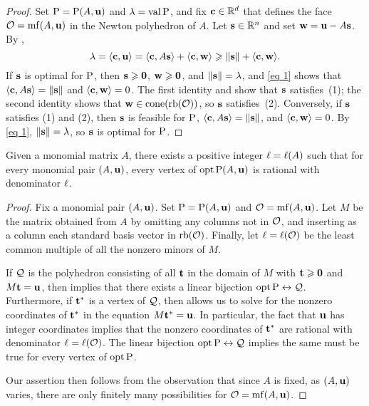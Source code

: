 \documentclass[11pt]{amsart}
\begin{document}
\begin{proof}
   Set $\mathrm{P} = \mathrm{P}(A, \mathbf{u})$ and $\lambda = \operatorname{val} \mathrm{P} $, and fix $\mathbf{c} \in \mathbb{R}^d$ that defines the face $\mathcal{O} = \operatorname{mf}(A, \mathbf{u})$ in the Newton polyhedron of $A$.
   Let $\mathbf{s} \in \mathbb{R}^n$ and set $\mathbf{w} = \mathbf{u} - A\mathbf{s}$.
   By ,
   \begin{equation}\label{eq 1}
      \lambda = \langle \mathbf{c}, \mathbf{u} \rangle = \langle \mathbf{c}, A \mathbf{s} \rangle + \langle \mathbf{c}, \mathbf{w} \rangle \geqslant \| \mathbf{s} \| + \langle \mathbf{c}, \mathbf{w} \rangle.
   \end{equation}
   If $\mathbf{s}$ is optimal for $\mathrm{P}$, then $\mathbf{s} \geqslant \mathbf{0}$, $\mathbf{w} \geqslant \mathbf{0}$, and $\| \mathbf{s} \| = \lambda$, and \eqref{eq 1} shows that $\langle \mathbf{c}, A \mathbf{s} \rangle = \| \mathbf{s} \|$ and $\langle \mathbf{c}, \mathbf{w} \rangle = 0$.
   The first identity and  show that $\mathbf{s}$ satisfies~(1); the second identity shows that $\mathbf{w}\in \operatorname{cone}(\operatorname{rb}(\mathcal{O}))$, so $\mathbf{s}$ satisfies~(2).
   Conversely, if $\mathbf{s}$ satisfies (1) and (2), then $\mathbf{s}$ is feasible for $\mathrm{P}$, $\langle \mathbf{c}, A \mathbf{s} \rangle = \| \mathbf{s} \|$, and $\langle \mathbf{c}, \mathbf{w} \rangle = 0$.
   By \eqref{eq 1}, $\| \mathbf{s} \| = \lambda$, so $\mathbf{s}$ is optimal for $\mathrm{P}$.
\end{proof}

\begin{theorem}  
\label{uniform denominators for vertices:  T}
Given a monomial matrix $A$, there exists a positive integer $\ell = \ell(A)$ such that for every monomial pair $(A, \mathbf{u})$, every vertex of $\operatorname{opt} \mathrm{P}(A, \mathbf{u})$ is rational with denominator $\ell$.
\end{theorem}

\begin{proof}
Fix a monomial pair $(A, \mathbf{u})$. Set $\mathrm{P} = \mathrm{P}(A, \mathbf{u})$ and $\mathcal{O} = \operatorname{mf}(A, \mathbf{u})$.  Let $M$ be the matrix obtained from $A$ by omitting any columns not in $\mathcal{O}$, and inserting as a column each standard basis vector in $\operatorname{rb}(\mathcal{O})$.  Finally, let $\ell = \ell(\mathcal{O})$ be the least common multiple of all the nonzero minors of $M$.

If $\mathcal{Q}$ is the polyhedron consisting of all $\mathbf{t}$ in the domain of $M$ with $\mathbf{t} \geqslant \mathbf{0}$ and $M \mathbf{t} = \mathbf{u}$, then  implies that there exists a linear bijection $\operatorname{opt} \mathrm{P} 
\leftrightarrow \mathcal{Q}$.  Furthermore, if $\mathbf{t}^{\ast}$ is a vertex of $\mathcal{Q}$, then  allows us to solve for the nonzero coordinates of $\mathbf{t}^{\ast}$ in the equation $M \mathbf{t}^{\ast} = \mathbf{u}$.  In particular, the fact that $\mathbf{u}$ has integer coordinates implies that the nonzero coordinates of $\mathbf{t}^{\ast}$ are rational with denominator $\ell = \ell(\mathcal{O})$.  The linear bijection $\operatorname{opt} \mathrm{P} \leftrightarrow \mathcal{Q}$ implies the same must be true for every vertex of $\operatorname{opt} \mathrm{P}$.

Our assertion then follows from the observation that since $A$ is fixed, as $(A, \mathbf{u})$ varies, there are only finitely many possibilities for $\mathcal{O} = \operatorname{mf}(A, \mathbf{u})$.
\end{proof}
\end{document}
